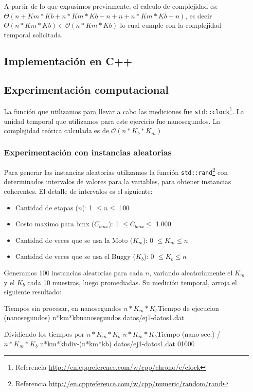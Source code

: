 A partir de lo que expusimos previamente, el calculo de complejidad es: $\Theta(n + Km*Kb + n*Km*Kb + n + n + n*Km*Kb + n)$, es decir $\Theta(n*Km*Kb) \in \mathcal{O}(n*Km*Kb)$ lo cual cumple con la complejidad temporal solicitada.

\newpage
\subsection{Implementación en C++}



\subsection{Experimentación computacional}
La función que utilizamos para llevar a cabo las mediciones fue \texttt{std::clock}\footnote{Referencia \url{http://en.cppreference.com/w/cpp/chrono/c/clock}}. La unidad temporal que utilizamos para este ejercicio fue nanosegundos.
La complejidad teórica calculada es de $\mathcal{O}(n*K_b*K_m)$

\subsubsection{Experimentación con instancias aleatorias}
Para generar las instancias aleatorias utilizamos la función \texttt{std::rand}\footnote{Referencia \url{http://en.cppreference.com/w/cpp/numeric/random/rand}} con determinados intervalos de valores para la variables, para obtener instancias coherentes. El detalle de intervalos es el siguiente:
\begin{itemize}
	\item Cantidad de etapas ($n$): 1 $\leq n \leq$ 100
    \item Costo maximo para bmx ($C_{bmx}$): 1 $\leq C_{bmx} \leq$ 1.000
    \item Cantidad de veces que se usa la Moto ($K_m$): 0 $\leq K_m \leq n$
    \item Cantidad de veces que se usa el Buggy ($K_b$): 0 $\leq K_b \leq n$
\end{itemize}

Generamos 100 instancias aleatorias para cada $n$, variando aleatoriamente el $K_m$ y el $K_b$ cada 10 muestras, luego promediadas. Su medición temporal, arroja el siguiente resultado:
\begin{center}
\graficarDatosMio
{Tiempos sin procesar, en nanosegundos}
{$n*K_m*K_b$}{Tiempo de ejecucion (nanosegundos)}
{n*km*kb}{nanosegundos}
{datos/ej1-datos1.dat}

\graficarDatosSinOutliers
{Dividiendo los tiempos por $n*K_m*K_b$}
{$n*K_m*K_b$}{Tiempo (nano sec.) / $n*K_m*K_b$}
{n*km*kb}{div-(n*km*kb)}
{datos/ej1-datos1.dat}
{0}{1000}
\end{center}

